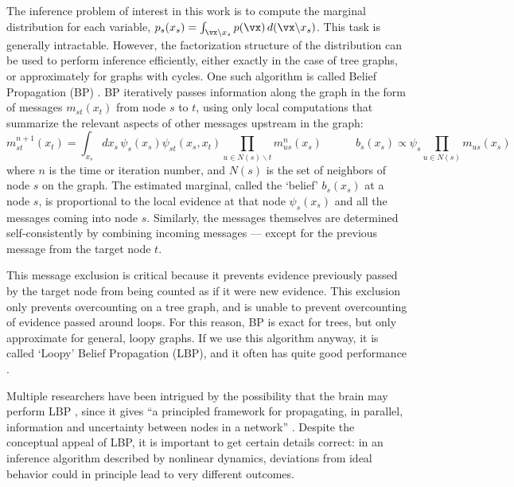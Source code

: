 \documentclass{article}
\begin{document}
The inference problem of interest in this work is to compute the marginal distribution for each variable, $p_s(x_s) = \int_{\vx\backslash x_s}p(\vx)\,d(\vx\backslash x_s)$. This task is generally intractable. However, the factorization structure of the distribution can be used to perform inference efficiently, either exactly in the case of tree graphs, or approximately for graphs with cycles. One such algorithm is called Belief Propagation (BP) \cite{pearl1988probabilistic}. BP iteratively passes information along the graph in the form of messages $m_{st}(x_t)$ from node $s$ to $t$, using only local computations that summarize the relevant aspects of other messages upstream in the graph:
\begin{equation}
m_{st}^{n+1} (x_t) = \int_{x_s}\!\! dx_s\,\psi_s(x_s) \psi_{st}(x_s,x_t)\!\!\!\!  \prod_{u \in N(s) \backslash t}\!\!\!\! m_{us}^n(x_s)
\hspace{3em}
b_s(x_s) \propto \psi_s\!\!\!\! \prod_{u \in N(s)} \!\!\!\! m_{us}(x_s)
\label{belief}
\end{equation}
where $n$ is the time or iteration number, and $N(s)$ is the set of neighbors of node $s$ on the graph. The estimated marginal, called the `belief' $b_s(x_s)$ at a node $s$, is proportional to the local evidence at that node $\psi_s(x_s)$ and all the messages coming into node $s$. Similarly, the messages themselves are determined self-consistently by combining incoming messages --- except for the previous message from the target node $t$.

This message exclusion is critical because it prevents evidence previously passed by the target node from being counted as if it were new evidence. This exclusion only prevents overcounting on a tree graph, and is unable to prevent overcounting of evidence passed around loops. For this reason, BP is exact for trees, but only approximate for general, loopy graphs. If we use this algorithm anyway, it is called `Loopy' Belief Propagation (LBP), and it often has quite good performance \cite{yedidia2003understanding}.


Multiple researchers have been intrigued by the possibility that the brain may perform LBP \cite{lee2003hierarchical,rao2004hierarchical,ott2006neurodynamics,george2009towards,litvak2009cortical,steimer2009belief}, since it gives ``a principled framework for propagating, in parallel, information and uncertainty between nodes in a network'' \cite{yedidia2003understanding}. Despite the conceptual appeal of LBP, it is important to get certain details correct: in an inference algorithm described by nonlinear dynamics, deviations from ideal behavior could in principle lead to very different outcomes.
\end{document}
